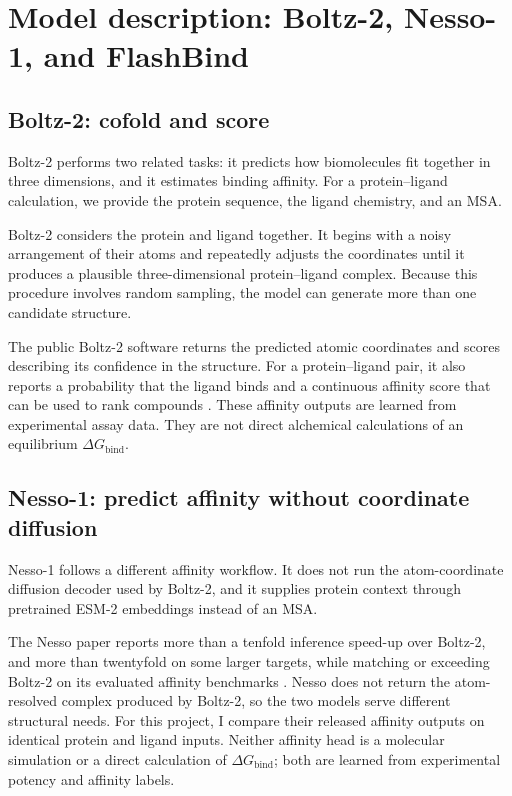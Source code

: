 \documentclass[11pt]{article}
\begin{document}
\section{Model description: Boltz-2, Nesso-1, and FlashBind}

\subsection{Boltz-2: cofold and score}

Boltz-2 performs two related tasks: it predicts how biomolecules fit together
in three dimensions, and it estimates binding affinity. For a protein--ligand
calculation, we provide the protein sequence, the ligand chemistry, and an MSA.


Boltz-2 considers the protein and ligand together. It begins with a noisy
arrangement of their atoms and repeatedly adjusts the coordinates until it
produces a plausible three-dimensional protein--ligand complex. Because this procedure involves random sampling,
the model can generate more than one candidate structure.

The public Boltz-2 software returns the predicted atomic coordinates and
scores describing its confidence in the structure. For a protein--ligand
pair, it also reports a probability that the ligand binds and a continuous
affinity score that can be used to rank compounds \citep{passaro2025boltz2}.
These affinity outputs are learned from experimental assay data. They are not
direct alchemical calculations of an equilibrium $\Delta G_\mathrm{bind}$.

\subsection{Nesso-1: predict affinity without coordinate diffusion}

Nesso-1 follows a different affinity workflow. It does not run the
atom-coordinate diffusion decoder used by Boltz-2, and it supplies protein
context through pretrained ESM-2 embeddings instead of an MSA.

The Nesso paper reports more than a tenfold inference speed-up over Boltz-2,
and more than twentyfold on some larger targets, while matching or exceeding
Boltz-2 on its evaluated affinity benchmarks \citep{shenoy2026nesso1}. Nesso
does not return the atom-resolved complex produced by Boltz-2, so the two
models serve different structural needs. For this project, I compare their
released affinity outputs on identical protein and ligand inputs. Neither
affinity head is a molecular simulation or a direct calculation of
$\Delta G_{\mathrm{bind}}$; both are learned from experimental potency and
affinity labels.
\end{document}
